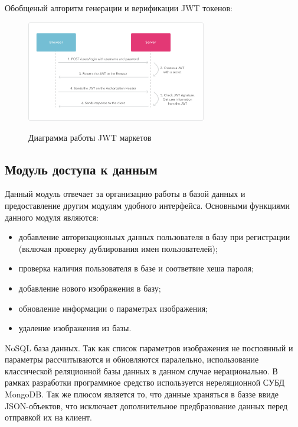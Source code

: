 Обобщеный алгоритм генерации и верификации JWT токенов:
\begin{figure}[ht]
    \centering
    \includegraphics[width=0.7\textwidth]{figures/jwt_diagram.png}
    \label{fig:architecture:jwt_diagram}
    \caption{Диаграмма работы JWT маркетов}
\end{figure}

\subsection{Модуль доступа к данным}
Данный модуль отвечает за организацию работы в базой данных и предоставление другим модулям удобного интерфейса.
Основными функциями данного модуля являются:
\begin{itemize}
  \item добавление авторизационыых данных пользователя в базу при регистрации (включая проверку дублирования имен пользователей);
  \item проверка наличия пользователя в базе и соответвие хеша пароля;
  \item добавление нового изображения в базу;
  \item обновление информации о параметрах изображения;
  \item удаление изображения из базы.
\end{itemize}

NoSQL база данных. Так как список параметров изображения не поспоянный и параметры рассчитываются и обновляются паралельно, использование классической реляционной базы данных в данном случае нерационально. В рамках разработки программное средство используется нереляционной СУБД MongoDB. Так же плюсом является то, что данные храняться в баззе ввиде JSON-объектов, что исключает дополнительное предбразование данных перед отправкой их на клиент.

